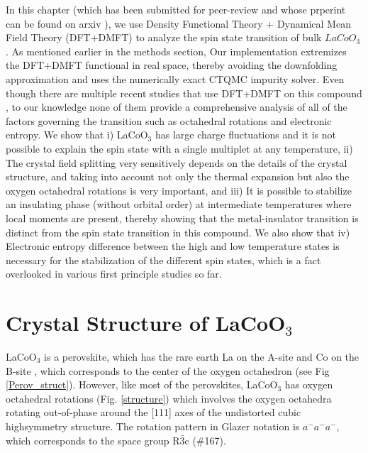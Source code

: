 \documentclass[10pt]{ruthesis}
\begin{document}
{In this chapter (which has been submitted for peer-review and whose prperint can be found on arxiv \cite{me_arxiv}), we use Density Functional Theory + Dynamical Mean Field Theory (DFT+DMFT)  to analyze the spin state transition of bulk $LaCoO_3$.  As mentioned earlier in the methods section, Our implementation extremizes the DFT+DMFT functional in real space, thereby avoiding the downfolding approximation and uses the numerically exact CTQMC impurity solver\cite{Dmft3,haule}.  Even though there are multiple recent studies that use DFT+DMFT on this compound \cite{craco, Zhang, Kunes_main}, to our knowledge none of them provide a comprehensive analysis of all of the factors governing the transition such as octahedral rotations and electronic entropy. We show that i) LaCoO$_3$ has large charge fluctuations and it is not possible to explain the spin state with a single multiplet at any temperature, ii) The crystal field splitting very sensitively depends on the details of the crystal structure, and taking into account not only the thermal expansion but also the oxygen octahedral rotations is very important, and  iii) It is possible to stabilize an insulating phase (without orbital order) at intermediate temperatures where local moments are present, thereby showing that the metal-insulator transition is distinct from the spin state transition in this compound. We also show that  iv) Electronic entropy difference between the high and low temperature states is necessary for the stabilization of the different spin states, which is a fact overlooked in various first principle studies so far. 


\section{Crystal Structure of LaCoO$_3$}

LaCoO$_3$ is a perovskite, which has the rare earth La on the A-site and Co on the B-site   , which corresponds to the center of the oxygen octahedron (see Fig \ref{Perov_struct}). However, like most of the perovskites, LaCoO$_3$ has oxygen octahedral rotations (Fig. \ref{structure}) which involves the oxygen octahedra rotating out-of-phase around the [111] axes of the undistorted cubic highsymmetry structure. The rotation pattern in Glazer notation is $a^-a^-a^-$, which corresponds to the space group R$\bar 3$c (\#167).

}
\end{document}
